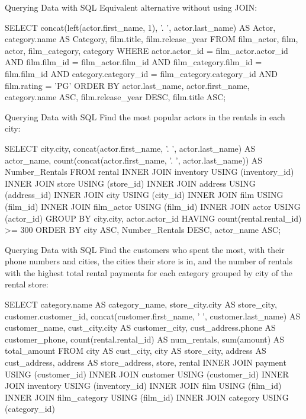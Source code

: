 \documentclass[ignorenonframetext,xcolor=x11names]{beamer}
\begin{document}
\begin{frame}[label=withcode,fragile]{Querying Data with SQL}
Equivalent alternative without using JOIN:
\footnotesize
\begin{sqlcode}
SELECT concat(left(actor.first_name, 1), 
              '. ', actor.last_name) AS Actor, 
       category.name AS Category, 
       film.title, 
       film.release_year
  FROM film_actor, film, actor, film_category, category
  WHERE actor.actor_id = film_actor.actor_id AND
        film.film_id = film_actor.film_id AND
        film_category.film_id = film.film_id AND
        category.category_id = film_category.category_id AND
        film.rating = 'PG'
  ORDER BY actor.last_name, 
           actor.first_name, 
           category.name ASC, 
           film.release_year DESC, 
           film.title ASC;
\end{sqlcode}
\end{frame}

\begin{frame}[label=withcode,fragile]{Querying Data with SQL}
Find the most popular actors in the rentals in each city:
\footnotesize
\begin{sqlcode}
SELECT city.city, 
       concat(actor.first_name, '. ', 
           actor.last_name) AS actor_name,
       count(concat(actor.first_name, '. ', 
           actor.last_name)) AS Number_Rentals
  FROM rental
  INNER JOIN inventory USING (inventory_id)
  INNER JOIN store USING (store_id)
  INNER JOIN address USING (address_id)
  INNER JOIN city USING (city_id)
  INNER JOIN film USING (film_id)
  INNER JOIN film_actor USING (film_id)
  INNER JOIN actor USING (actor_id)
  GROUP BY city.city, actor.actor_id
  HAVING count(rental.rental_id) >= 300
  ORDER BY city ASC, 
           Number_Rentals DESC, 
           actor_name ASC;
\end{sqlcode}
\end{frame}

\begin{frame}[label=withcode,fragile]{Querying Data with SQL}
Find the customers who spent the most, with their phone numbers and cities, the cities their store is in, and the number of rentals with the highest total rental payments for each category grouped by city of the rental store:
\scriptsize
\begin{sqlcode}
SELECT category.name AS category_name, 
       store_city.city AS store_city,
       customer.customer_id, 
       concat(customer.first_name, ' ', 
          customer.last_name) AS customer_name,
       cust_city.city AS customer_city,
       cust_address.phone AS customer_phone,
       count(rental.rental_id) AS num_rentals,
       sum(amount) AS total_amount
 FROM city AS cust_city, city AS store_city, 
      address AS cust_address, address AS store_address, 
      store, rental
 INNER JOIN payment USING (customer_id)
 INNER JOIN customer USING (customer_id)
 INNER JOIN inventory USING (inventory_id)
 INNER JOIN film USING (film_id)
 INNER JOIN film_category USING (film_id)
 INNER JOIN category USING (category_id)
\end{sqlcode}
\end{frame}
\end{document}
